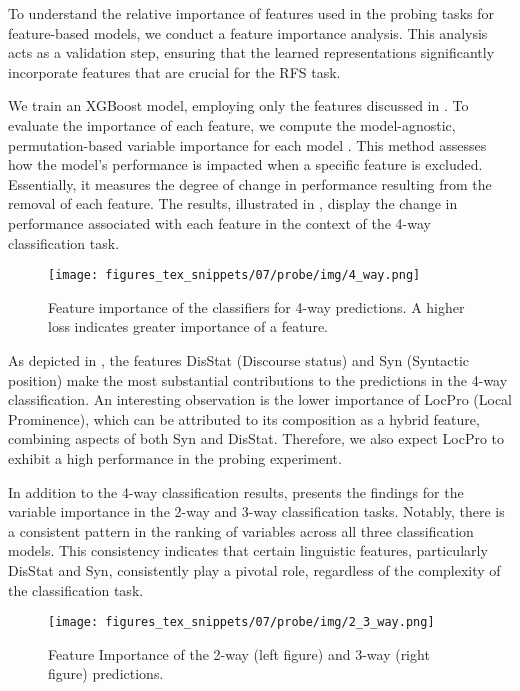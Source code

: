 To understand the relative importance of features used in the probing tasks for feature-based models, we conduct a feature importance analysis. This analysis acts as a validation step, ensuring that the learned representations significantly incorporate features that are crucial for the RFS task.

We train an XGBoost model, employing only the features discussed in . To evaluate the importance of each feature, we compute the model-agnostic, permutation-based variable importance for each model \citep{Biecek2021}. This method assesses how the model's performance is impacted when a specific feature is excluded. Essentially, it measures the degree of change in performance resulting from the removal of each feature. The results, illustrated in , display the change in performance associated with each feature in the context of the 4-way classification task. 

\begin{figure}
	\centering
	\texttt{[image: figures\_tex\_snippets/07/probe/img/4\_way.png]}
	\caption[Feature importance of the  4-way predictions.]{Feature importance of the  classifiers for 4-way predictions. A higher loss indicates greater importance of a feature.}
	\label{fig:ablation}
\end{figure}

As depicted in , the features DisStat (Discourse status) and Syn (Syntactic position) make the most substantial contributions to the predictions in the 4-way classification. An interesting observation is the lower importance of LocPro (Local Prominence), which can be attributed to its composition as a hybrid feature, combining aspects of both Syn and DisStat. Therefore, we also expect LocPro to exhibit a high performance in the probing experiment.

In addition to the 4-way classification results,  presents the findings for the variable importance in the 2-way and 3-way classification tasks. Notably, there is a consistent pattern in the ranking of variables across all three classification models. This consistency indicates that certain linguistic features, particularly DisStat and Syn, consistently play a pivotal role, regardless of the complexity of the classification task.

\begin{figure*}
	\centering
	\texttt{[image: figures\_tex\_snippets/07/probe/img/2\_3\_way.png]}
	\caption[Feature Importance of the  2-way and 3-way predictions.]{Feature Importance of the  2-way (left figure) and 3-way (right figure) predictions.}
	\label{fig:varimp_2_3}
\end{figure*}


